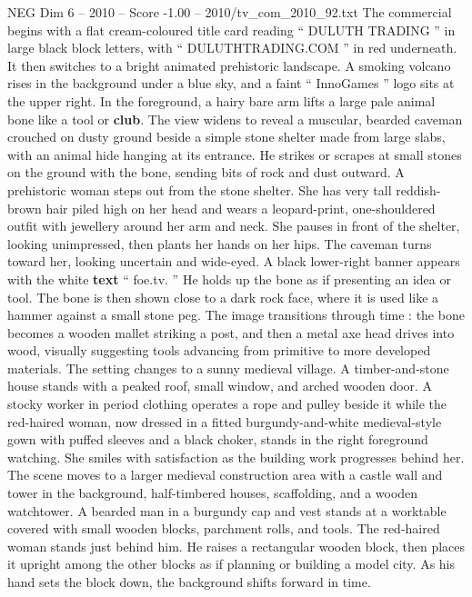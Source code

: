 \begin{textsample}{NEG Dim 6 – 2010 – Score -1.00 – 2010/tv\_com\_2010\_92.txt}  \label{ex:f6_neg_018}
The commercial begins with a flat cream-coloured title card reading “ DULUTH TRADING ” in large black block letters, with “ DULUTHTRADING.COM ” in red underneath.
It then switches to a bright animated prehistoric landscape.
A smoking volcano rises in the background under a blue sky, and a faint “ InnoGames ” logo sits at the upper right.
In the foreground, a hairy bare arm lifts a large pale animal bone like a tool or \textbf{club}.
The view widens to reveal a muscular, bearded caveman crouched on dusty ground beside a simple stone shelter made from large slabs, with an animal hide hanging at its entrance.
He strikes or scrapes at small stones on the ground with the bone, sending bits of rock and dust outward.
A prehistoric woman steps out from the stone shelter.
She has very tall reddish-brown hair piled high on her head and wears a leopard-print, one-shouldered outfit with jewellery around her arm and neck.
She pauses in front of the shelter, looking unimpressed, then plants her hands on her hips.
The caveman turns toward her, looking uncertain and wide-eyed.
A black lower-right banner appears with the white \textbf{text} “ foe.tv. ” He holds up the bone as if presenting an idea or tool.
The bone is then shown close to a dark rock face, where it is used like a hammer against a small stone peg.
The image transitions through time : the bone becomes a wooden mallet striking a post, and then a metal axe head drives into wood, visually suggesting tools advancing from primitive to more developed materials.
The setting changes to a sunny medieval village.
A timber-and-stone house stands with a peaked roof, small window, and arched wooden door.
A stocky worker in period clothing operates a rope and pulley beside it while the red-haired woman, now dressed in a fitted burgundy-and-white medieval-style gown with puffed sleeves and a black choker, stands in the right foreground watching.
She smiles with satisfaction as the building work progresses behind her.
The scene moves to a larger medieval construction area with a castle wall and tower in the background, half-timbered houses, scaffolding, and a wooden watchtower.
A bearded man in a burgundy cap and vest stands at a worktable covered with small wooden blocks, parchment rolls, and tools.
The red-haired woman stands just behind him.
He raises a rectangular wooden block, then places it upright among the other blocks as if planning or building a model city.
As his hand sets the block down, the background shifts forward in time.

\end{textsample}
